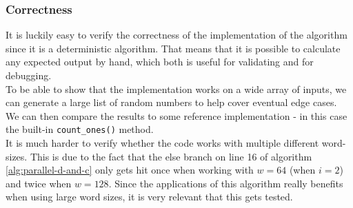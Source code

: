 \subsubsection{Correctness}
It is luckily easy to verify the correctness of the implementation of the algorithm since it is a deterministic algorithm. That means that it is possible to calculate any expected output by hand, which both is useful for validating and for debugging.\\
To be able to show that the implementation works on a wide array of inputs, we can generate a large list of random numbers to help cover eventual edge cases. We can then compare the results to some reference implementation - in this case the built-in \texttt{count\_ones()} method.\\
It is much harder to verify whether the code works with multiple different word-sizes. This is due to the fact that the else branch on line 16 of algorithm \ref{alg:parallel-d-and-c} only gets hit once when working with $w=64$ (when $i=2$) and twice when $w=128$. Since the applications of this algorithm really benefits when using large word sizes, it is very relevant that this gets tested.

